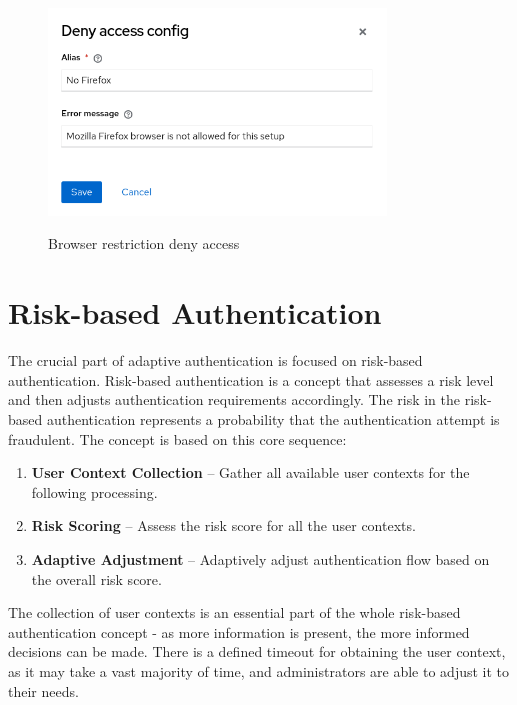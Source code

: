 \begin{figure}[htbp]
  \centering
  \includegraphics[width=0.8\textwidth]{img/sections/5-design/policy-browser-deny.png}
  \label{fig:design-policy-browser-flow-deny}
  \caption{Browser restriction deny access}
\end{figure}

\newpage
\section{Risk-based Authentication}
The crucial part of adaptive authentication is focused on risk-based authentication.
Risk-based authentication is a concept that assesses a risk level and then adjusts authentication requirements accordingly.
The risk in the risk-based authentication represents a probability that the authentication attempt is fraudulent.
\newline
\newline
The concept is based on this core sequence:
\begin{enumerate}
    \item \textbf{User Context Collection} -- Gather all available user contexts for the following processing. 
    \item \textbf{Risk Scoring} -- Assess the risk score for all the user contexts. 
    \item \textbf{Adaptive Adjustment} -- Adaptively adjust authentication flow based on the overall risk score.
\end{enumerate}

The collection of user contexts is an essential part of the whole risk-based authentication concept - as more information is present, the more informed decisions can be made.
There is a defined timeout for obtaining the user context, as it may take a vast majority of time, and administrators are able to adjust it to their needs.

